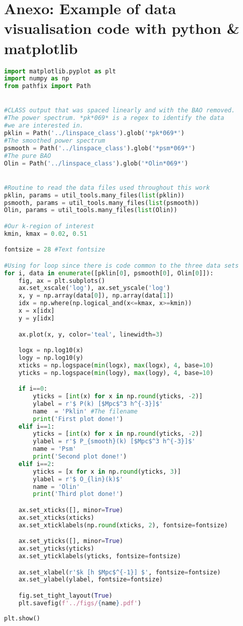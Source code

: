 \chapter*{Anexo: Example of data visualisation code with python \& matplotlib}

\renewcommand{\baselinestretch}{1}
\begin{lstlisting}[language=python]
import matplotlib.pyplot as plt
import numpy as np
from pathfix import Path


#CLASS output that was spaced linearly and with the BAO removed.
#The power spectrum. *pk*069* is a regex to identify the data
#we are interested in.
pklin = Path('../linspace_class').glob('*pk*069*') 
#The smoothed power spectrum
psmooth = Path('../linspace_class').glob('*psm*069*') 
#The pure BAO
Olin = Path('../linspace_class').glob('*Olin*069*') 


#Routine to read the data files used throughout this work
pklin, params = util_tools.many_files(list(pklin))
psmooth, params = util_tools.many_files(list(psmooth))
Olin, params = util_tools.many_files(list(Olin))

#Our k-region of interest
kmin, kmax = 0.02, 0.51

fontsize = 28 #Text fontsize

#Using for loop since there is code common to the three data sets
for i, data in enumerate([pklin[0], psmooth[0], Olin[0]]):
    fig, ax = plt.subplots()
    ax.set_xscale('log'), ax.set_yscale('log')
    x, y = np.array(data[0]), np.array(data[1])
    idx = np.where(np.logical_and(x<=kmax, x>=kmin))
    x = x[idx]
    y = y[idx]

    ax.plot(x, y, color='teal', linewidth=3)

    logx = np.log10(x)
    logy = np.log10(y)
    xticks = np.logspace(min(logx), max(logx), 4, base=10)
    yticks = np.logspace(min(logy), max(logy), 4, base=10)

    if i==0:
        yticks = [int(x) for x in np.round(yticks, -2)]
        ylabel = r'$ P(k) [$Mpc$^3 h^{-3}]$' 
        name  = 'Pklin' #The filename
        print('First plot done!')
    elif i==1:
        yticks = [int(x) for x in np.round(yticks, -2)]
        ylabel = r'$ P_{smooth}(k) [$Mpc$^3 h^{-3}]$' 
        name = 'Psm'
        print('Second plot done!')
    elif i==2:
        yticks = [x for x in np.round(yticks, 3)]
        ylabel = r'$ O_{lin}(k)$'
        name = 'Olin'
        print('Third plot done!')

    ax.set_xticks([], minor=True)
    ax.set_xticks(xticks)
    ax.set_xticklabels(np.round(xticks, 2), fontsize=fontsize)

    ax.set_yticks([], minor=True)
    ax.set_yticks(yticks)
    ax.set_yticklabels(yticks, fontsize=fontsize)

    ax.set_xlabel(r'$k [h $Mpc$^{-1}] $', fontsize=fontsize) 
    ax.set_ylabel(ylabel, fontsize=fontsize)

    fig.set_tight_layout(True)
    plt.savefig(f'../figs/{name}.pdf')
   
plt.show()



\end{lstlisting}
\renewcommand{\baselinestretch}{1.5}



